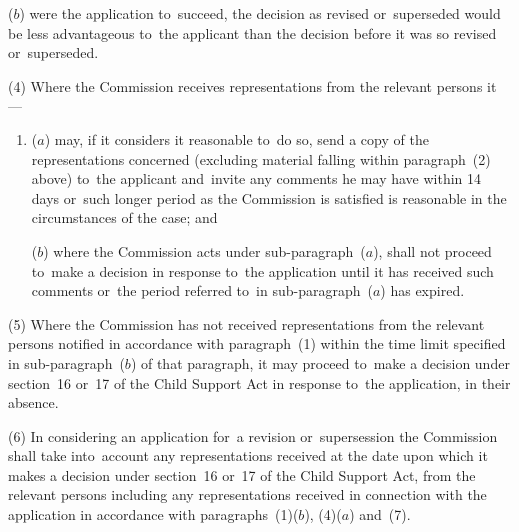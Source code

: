 \documentclass[12pt,a4paper]{article}
\begin{document}
{\begin{enumerate}
($b$) were the application to~succeed, the decision as revised or~superseded would be less advantageous to~the applicant than the decision before it was so revised or~superseded.
\end{enumerate}

(4) Where the 
Commission  %
receives representations from the relevant persons 
it%
—
\begin{enumerate}\item[]
($a$) may, if 
it  %
considers it reasonable to~do so, send a copy of the representations concerned (excluding material falling within paragraph~(2) above) to~the applicant and~invite any comments he may have within 14 days or~such longer period as the 
Commission  %
is satisfied is reasonable in the circumstances of the case; and

($b$) where the 
Commission  %
acts under sub-paragraph~($a$), shall not proceed to~make a decision in response to~the application until 
it  %
has received such comments or~the period referred to~in sub-paragraph~($a$)  has expired.
\end{enumerate}

(5) Where the 
Commission  %
has not received representations from the relevant persons notified in accordance with paragraph~(1) within the time limit specified in sub-paragraph~($b$)  of that paragraph, 
it  %
may proceed to~make a decision under section~16 or~17 of the Child Support Act in response to~the application, in their absence.

(6) In considering an application for~a revision or~supersession the 
Commission  %
shall take into~account any representations received at the date upon which 
it  %
makes a decision under section~16 or~17 of the Child Support Act, from the relevant persons including any representations received in connection with the application in accordance with paragraphs~(1)($b$), (4)($a$)  and~(7).

}
\end{document}
